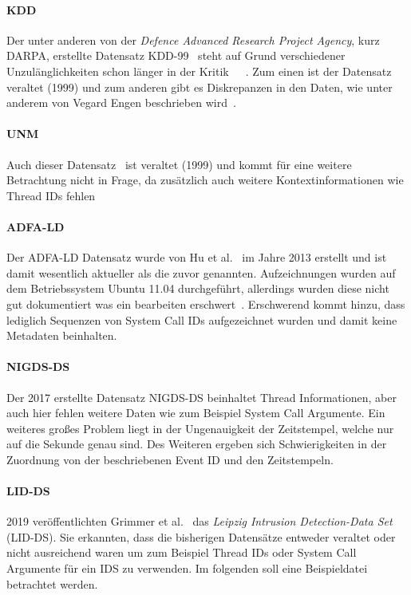         \paragraph{KDD}
            Der unter anderen von der \textit{Defence Advanced Research Project Agency}, kurz DARPA, erstellte Datensatz KDD-99~\cite{DARPA}
            steht auf Grund verschiedener Unzulänglichkeiten schon länger in der Kritik~\cite{KDD}~\cite{KDD2}~\cite{UNM}.
            Zum einen ist der Datensatz veraltet (1999) und zum anderen gibt es Diskrepanzen in den Daten, wie unter anderem von Vegard Engen beschrieben wird~\cite{KDD}.
        \paragraph{UNM}
            Auch dieser Datensatz~\cite{UNM} ist veraltet (1999) und kommt für eine weitere Betrachtung nicht in Frage,
            da zusätzlich auch weitere Kontextinformationen wie Thread IDs fehlen~\cite{UNMcritic}
        \paragraph{ADFA-LD}
            Der ADFA-LD Datensatz wurde von Hu et al.~\cite{UNMcritic} im Jahre 2013 erstellt und ist damit wesentlich aktueller als die zuvor genannten.
            Aufzeichnungen wurden auf dem Betriebssystem Ubuntu 11.04 durchgeführt, allerdings wurden diese nicht gut dokumentiert was ein bearbeiten erschwert~\cite{ADFA-LDcritic}.
            Erschwerend kommt hinzu, dass lediglich Sequenzen von System Call IDs aufgezeichnet wurden und damit keine Metadaten beinhalten.
        \paragraph{NIGDS-DS}
            Der 2017 erstellte Datensatz NIGDS-DS beinhaltet Thread Informationen, aber auch hier fehlen weitere Daten wie zum Beispiel System Call Argumente.
            Ein weiteres großes Problem liegt in der Ungenauigkeit der Zeitstempel, welche nur auf die Sekunde genau sind.
            Des Weiteren ergeben sich Schwierigkeiten in der Zuordnung von der beschriebenen Event ID und den Zeitstempeln.
        \paragraph{LID-DS}
            2019 veröffentlichten Grimmer et al.~\cite{LIDDS} das \textit{Leipzig Intrusion Detection-Data Set} (LID-DS).
            Sie erkannten, dass die bisherigen Datensätze entweder veraltet oder nicht ausreichend waren um zum Beispiel Thread IDs oder System Call Argumente für ein IDS zu verwenden.
            Im folgenden soll eine Beispieldatei betrachtet werden.

